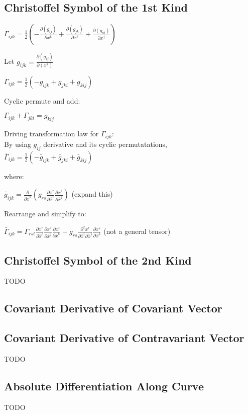 \documentclass[8pt,letter]{article}
\begin{document}
\begin{multicols*}{2}
  \subsection{Christoffel Symbol of the 1st Kind}

  $\Gamma_{ijk} = \frac{1}{2}\left( - \frac{\partial (g_{ij})}{\partial x^k} + \frac{\partial (g_{jk})}{\partial x^i} + \frac{\partial (g_{ki})}{\partial x^j} \right)$

  Let $g_{ijk}=\frac{\partial(g_{ij})}{\partial(x^k)}$

  $\Gamma_{ijk} = \frac{1}{2}( -g_{ijk} + g_{jki} + g_{kij})$

  Cyclic permute and add:

  $\Gamma_{ijk} + \Gamma_{jki} = g_{kij}$

  Driving transformation law for $\Gamma_{ijk}$:\\
  By using $g_{ij}$ derivative and its cyclic permutatations,\\
  $\bar{\Gamma}_{ijk} = \frac{1}{2}( -\bar{g}_{ijk} + \bar{g}_{jki} + \bar{g}_{kij})$

  where:
  
  $\bar{g}_{ijk} = \frac{\partial}{\partial \bar{x}^k} \left(g_{rs} \frac{\partial x^r}{\partial \bar{x}^i} \frac{\partial x^s}{\partial \bar{x}^j}\right)$ (expand this)

  Rearrange and simplify to:

  $\bar{\Gamma}_{ijk} = \Gamma_{rst} \frac{\partial x^r}{\partial \bar{x}^i} \frac{\partial x^s}{\partial \bar{x}^j} \frac{\partial x^t}{\partial \bar{x}^k} + g_{rs} \frac{\partial^2 x^r}{\partial \bar{x}^i \partial \bar{x}^j} \frac{\partial x^s}{\partial \bar{x}^k}$ (not a general tensor)
  
  \subsection{Christoffel Symbol of the 2nd Kind}

  TODO

  \subsection{Covariant Derivative of Covariant Vector}


  \subsection{Covariant Derivative of Contravariant Vector}
  
  TODO

  \subsection{Absolute Differentiation Along Curve}
  
  TODO
  
\end{multicols*}
\end{document}
